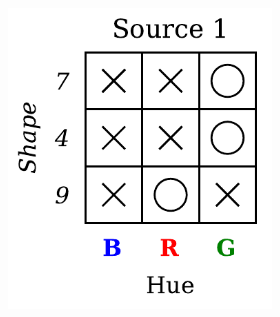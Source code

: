 \begin{dataset}
\begin{figure}[H]
        \begin{subfigure}[b]{0.45\textwidth}
            \centering
            \begin{subfigure}[b]{0.48\textwidth}
                \centering
                \includegraphics[width=\textwidth]{img/datasets/3-CGO_fact=hue_env=0.pdf}
            \end{subfigure}
            \begin{subfigure}[b]{0.48\textwidth}
                \centering

\end{subfigure}
\end{subfigure}
\end{figure}
\end{dataset}
